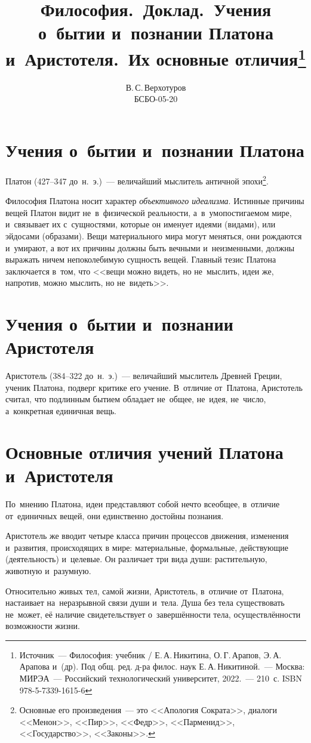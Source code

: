 \documentclass[14pt]{extarticle}
\title{Философия.~Доклад.~Учения о~бытии и~познании Платона и~Аристотеля.~Их основные отличия\footnote{Источник~--- Философия: учебник / Е.\,А.\,Никитина, О.\,Г.\,Арапов, Э.\,А.\,Арапова и~(др).
		Под общ. ред. д-ра филос. наук Е.\,А.\,Никитиной.~--- Москва: МИРЭА~--- Российский технологический университет, 2022.~--- 210~с.
		ISBN 978-5-7339-1615-6}}
\author{В.\,С.\,Верхотуров \\ БСБО-05-20}
\affil{РТУ МИРЭА}
\begin{document}
	\maketitle
	
	
	\section{Учения о~бытии и~познании Платона}
	Платон (427--347 до~н.~э.)~--- величайший мыслитель античной эпохи\footnote{Основные его произведения~--- это <<Апология Сократа>>, диалоги <<Менон>>, <<Пир>>, <<Федр>>, <<Парменид>>, <<Государство>>, <<Законы>>.}.
	
	\sloppy Философия Платона носит характер \emph{объективного идеализма}. Истинные причины вещей Платон видит не~в~физической реальности, а~в~умопостигаемом мире, и~связывает их с~сущностями, которые он именует идеями (видами), или эйдосами (образами). Вещи материального мира могут меняться, они рождаются и~умирают, а вот их причины должны быть вечными и~неизменными, должны выражать ничем непоколебимую сущность вещей. Главный тезис Платона заключается в~том, что <<вещи можно видеть, но не~мыслить, идеи же, напротив, можно мыслить, но не~видеть>>.
	
	
	\section{Учения о~бытии и~познании Аристотеля}
	
	Аристотель (384--322 до~н.~э.)~--- величайший мыслитель Древней Греции, ученик Платона, подверг критике его учение. В~отличие от~Платона, Аристотель считал, что подлинным бытием обладает не~общее, не~идея, не~число, а~конкретная единичная вещь.
	
	\section{Основные отличия учений Платона и~Аристотеля}
	
	По~мнению Платона, идеи представляют собой нечто всеобщее, в~отличие от~единичных вещей, они единственно достойны познания. 
	
	Аристотель же вводит четыре класса причин процессов движения, изменения и~развития, происходящих в мире: материальные, формальные, действующие (деятельность) и~целевые. Он различает три вида души: растительную, животную и~разумную.
	
	Относительно живых тел, самой жизни, Аристотель, в~отличие от~Платона, настаивает на~неразрывной связи души и~тела. Душа без тела существовать не~может, её наличие свидетельствует о~завершённости тела, осуществлённости возможности жизни.
	
\end{document}
